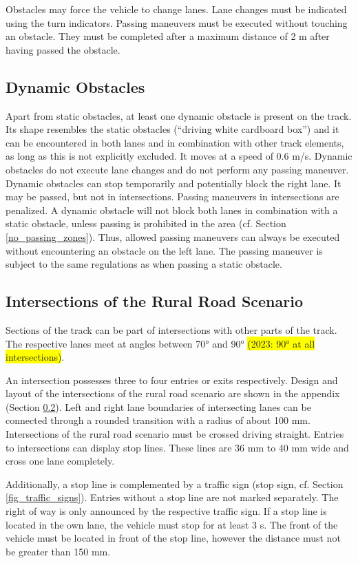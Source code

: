 \documentclass[a4paper]{report}
\begin{document}
{Obstacles may force the vehicle to change lanes. Lane changes must be indicated using the turn indicators. Passing maneuvers must be executed without touching an obstacle. They must be completed after a maximum distance of 2 m after having passed the obstacle. 

\subsection{Dynamic Obstacles}

Apart from static obstacles, at least one dynamic obstacle is present on the track. Its shape resembles the static obstacles (“driving white cardboard box”) and it can be encountered in both lanes and in combination with other track elements, as long as this is not explicitly excluded. It moves at a speed of 0.6 m/s. Dynamic obstacles do not execute lane changes and do not perform any passing maneuver. Dynamic obstacles can stop temporarily and potentially block the right lane. It may be passed, but not in intersections. Passing maneuvers in intersections are penalized. A dynamic obstacle will not block both lanes in combination with a static obstacle, unless passing is prohibited in the area (cf. Section \ref{no_passing_zones}). Thus, allowed passing maneuvers can always be executed without encountering an obstacle on the left lane. The passing maneuver is subject to the same regulations as when passing a static obstacle. 

\subsection{Intersections of the Rural Road Scenario}
\label{intersection_rural}

Sections of the track can be part of intersections with other parts of the track. The respective lanes meet at angles between 70° and 90° \colorbox{yellow}{(2023: 90° at all intersections)}. 

An intersection possesses three to four entries or exits respectively. Design and layout of the intersections of the rural road scenario are shown in the appendix (Section \ref{intersection_rural}). Left and right lane boundaries of intersecting lanes can be connected through a rounded transition with a radius of about 100 mm. Intersections of the rural road scenario must be crossed driving straight. Entries to intersections can display stop lines. These lines are 36 mm to 40 mm wide and cross one lane completely.

Additionally, a stop line is complemented by a traffic sign (stop sign, cf. Section \ref{fig_traffic_signs}). Entries without a stop line are not marked separately. The right of way is only announced by the respective traffic sign. If a stop line is located in the own lane, the vehicle must stop for at least 3 s. The front of the vehicle must be located in front of the stop line, however the distance must not be greater than 150 mm. 

}
\end{document}
